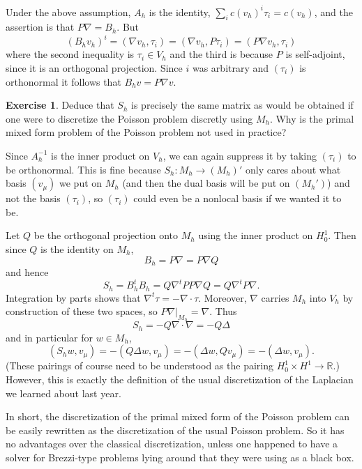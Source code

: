 \documentclass[10pt]{article}
\newcommand{\RR}{\mathbb{R}}
\theoremstyle{definition}
\newtheorem{exer}{Exercise}
\begin{document}
Under the above assumption, $A_h$ is the identity, $\sum_i c(v_h)^i \tau_i = c(v_h)$, and the assertion is that $P\nabla = B_h$.
But 
$$(B_hv_h)^i = (\nabla v_h, \tau_i) = (\nabla v_h, P\tau_i) = (P\nabla v_h, \tau_i)$$
where the second inequality is $\tau_i \in V_h$ and the third is because $P$ is self-adjoint, since it is an orthogonal projection.
Since $i$ was arbitrary and $(\tau_i)$ is orthonormal it follows that $B_h v = P \nabla v$.

\begin{exer}
    Deduce that $S_h$ is precisely the same matrix as would be obtained if one were to discretize the Poisson problem discretly using $M_h$.
    Why is the primal mixed form problem of the Poisson problem not used in practice?
\end{exer}

Since $A_h^{-1}$ is the inner product on $V_h$, we can again suppress it by taking $(\tau_i)$ to be orthonormal.
This is fine because $S_h: M_h \to (M_h)'$ only cares about what basis $(v_\mu)$ we put on $M_h$ (and then the dual basis will be put on $(M_h')$) and not the basis $(\tau_i)$, so $(\tau_i)$ could even be a nonlocal basis if we wanted it to be.

Let $Q$ be the orthogonal projection onto $M_h$ using the inner product on $H^1_0$.
Then since $Q$ is the identity on $M_h$,
$$B_h = P\nabla = P\nabla Q$$
and hence
$$S_h = B_h^t B_h = Q\nabla^t PP\nabla Q = Q \nabla^t P \nabla.$$
Integration by parts shows that $\nabla^t \tau = - \nabla \cdot \tau$.
Moreover, $\nabla$ carries $M_h$ into $V_h$ by construction of these two spaces, so $P\nabla|_{M_h} = \nabla$.
Thus 
$$S_h = -Q \nabla \cdot \nabla = -Q\Delta$$
and in particular for $w \in M_h$,
$$(S_h w, v_\mu) = -(Q\Delta w, v_\mu) = -(\Delta w, Qv_\mu) = -(\Delta w, v_\mu).$$
(These pairings of course need to be understood as the pairing $H^1_0 \times H^1 \to \RR$.)
However, this is exactly the definition of the usual discretization of the Laplacian we learned about last year.

In short, the discretization of the primal mixed form of the Poisson problem can be easily rewritten as the discretization of the usual Poisson problem.
So it has no advantages over the classical discretization, unless one happened to have a solver for Brezzi-type problems lying around that they were using as a black box.
\end{document}
